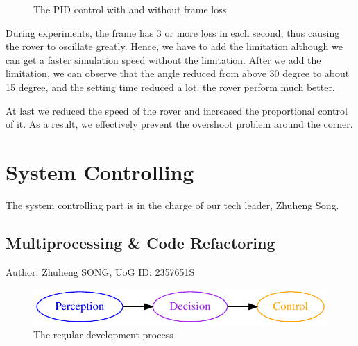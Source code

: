 \begin{figure}[htbp]
    \centering
    \caption{The PID control with and without frame loss}
    \label{fig:frame_loss}
\end{figure}

During experiments, the frame has 3 or more loss in each second, thus causing the rover to oscillate greatly. Hence, we have to add the limitation although we can get a faster simulation speed without the limitation. After we add the limitation, we can observe that the angle reduced from above 30 degree to about 15 degree, and the setting time reduced a lot. the rover perform much better. 

At last we reduced the speed of the rover and increased the proportional control of it. As a result, we effectively prevent the overshoot problem around the corner.
\section{System Controlling\label{sec4.5}}
The system controlling part is in the charge of our tech leader, Zhuheng Song. 
\subsection{Multiprocessing \& Code Refactoring}
Author: Zhuheng SONG, UoG ID: 2357651S\\

\begin{figure}[htbp]
    \centering
    \includegraphics[width=14cm]{implementation/img_song/regular_development.pdf}
    \caption{The regular development process}
    \label{fig:regular_development}
\end{figure}


